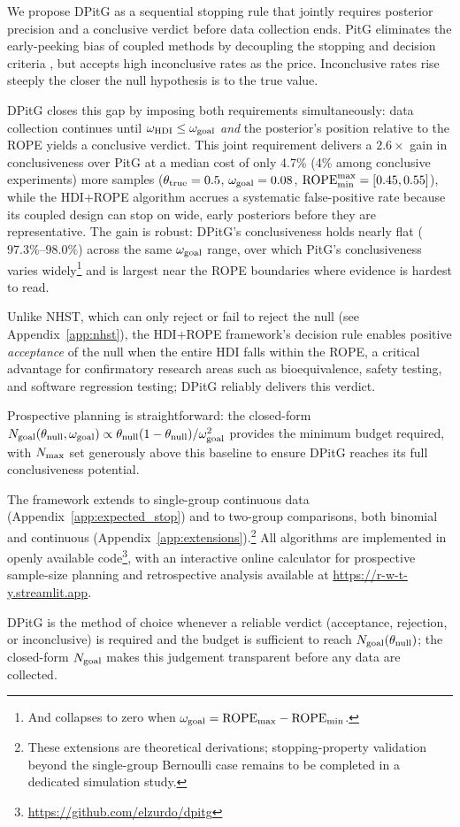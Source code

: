 
We propose DPitG as a sequential stopping rule that jointly requires posterior
precision and a conclusive verdict before data collection ends.
PitG eliminates the early-peeking bias of coupled methods by decoupling the stopping
and decision criteria \citep{kruschke2015doing}, but accepts high inconclusive rates
as the price. Inconclusive rates rise steeply the closer the null hypothesis is to the true value.

DPitG closes this gap by imposing both requirements simultaneously: data collection
continues until $\omega_{\rm HDI} \le \omega_{\rm goal}$ \textit{and} the posterior's
position relative to the ROPE yields a conclusive verdict.
This joint requirement delivers a $2.6\times$ gain in conclusiveness over PitG at a
median cost of only 4.7\% (4\% among conclusive experiments) more samples
($\theta_{\rm true}=0.5$, $\omega_{\rm goal}=0.08$,
${\rm ROPE}_{\rm min}^{\rm max}=[0.45,0.55]$),
while the HDI+ROPE algorithm accrues a systematic false-positive rate because its
coupled design can stop on wide, early posteriors before they are representative.
The gain is robust: DPitG's conclusiveness holds nearly flat ($97.3\%$--$98.0\%$)
across the same $\omega_{\rm goal}$ range, over which PitG's conclusiveness
varies widely\footnote{And collapses to zero when $\omega_{\rm goal} = {\rm ROPE}_{\rm max} - {\rm ROPE}_{\rm min}$.}
and is largest near the ROPE boundaries where evidence is hardest to read.

Unlike NHST, which can only reject or fail to reject the null (see Appendix~\ref{app:nhst}),
the HDI+ROPE framework's decision rule enables positive \textit{acceptance} of the null
when the entire HDI falls within the ROPE, a critical advantage for confirmatory
research areas such as bioequivalence, safety testing, and software regression testing;
DPitG reliably delivers this verdict.

Prospective planning is straightforward: the closed-form
$N_{\rm goal}(\theta_{\rm null}, \omega_{\rm goal}) \propto
\theta_{\rm null}(1-\theta_{\rm null})/\omega_{\rm goal}^2$
provides the minimum budget required, with $N_{\rm max}$ set generously above this
baseline to ensure DPitG reaches its full conclusiveness potential.

The framework extends to single-group continuous data
(Appendix~\ref{app:expected_stop}) and to two-group comparisons, both binomial
and continuous (Appendix~\ref{app:extensions}).\footnote{These extensions are
theoretical derivations; stopping-property validation beyond the single-group Bernoulli
case remains to be completed in a dedicated simulation study.}
All algorithms are implemented in openly available
code\footnote{\href{https://github.com/elzurdo/dpitg}{https://github.com/elzurdo/dpitg}},
with an interactive online calculator for prospective sample-size planning and
retrospective analysis available at
\href{https://r-w-t-y.streamlit.app}{https://r-w-t-y.streamlit.app}.

DPitG is the method of choice whenever a reliable verdict (acceptance, rejection,
or inconclusive) is required and the budget is sufficient to reach
$N_{\rm goal}(\theta_{\rm null})$; the closed-form $N_{\rm goal}$ makes this judgement
transparent before any data are collected.
